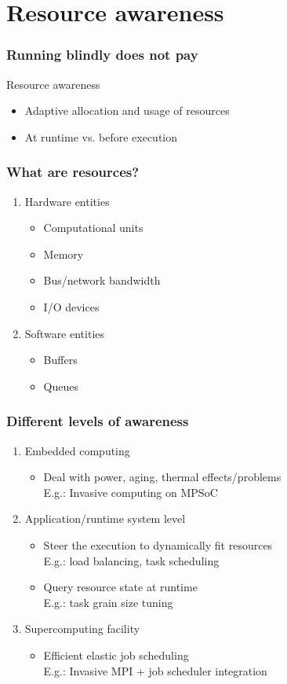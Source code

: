\documentclass[compress]{beamer}
\begin{document}
\section{Resource awareness}
\begin{frame}
	\frametitle{Running blindly does not pay}
	Resource awareness
	\begin{itemize}
		\item Adaptive allocation and usage of resources
		\item At runtime vs. before execution
	\end{itemize}
\end{frame}

\begin{frame}
	\frametitle{What are resources?}
	\begin{enumerate}
		\item Hardware entities
			\begin{itemize}
				\item Computational units
				\item Memory
				\item Bus/network bandwidth
				\item I/O devices
			\end{itemize}
		\item Software entities
			\begin{itemize}
				\item Buffers
				\item Queues
			\end{itemize}
	\end{enumerate}
\end{frame}

\begin{frame}
	\frametitle{Different levels of awareness}
	\begin{enumerate}
		\item Embedded computing
		\begin{itemize}
			\item Deal with power, aging, thermal effects/problems\\
			E.g.: Invasive computing on MPSoC
		\end{itemize}
		\pause
		\item Application/runtime system level
		\begin{itemize}
			\item Steer the execution to dynamically fit resources\\
			E.g.: load balancing, task scheduling
			\item Query resource state at runtime\\
			E.g.: task grain size tuning
		\end{itemize}
		\pause
		\item Supercomputing facility
		\begin{itemize}
			\item Efficient elastic job scheduling\\
			E.g.: Invasive MPI + job scheduler integration
		\end{itemize}
	\end{enumerate}
\end{frame}
\end{document}
